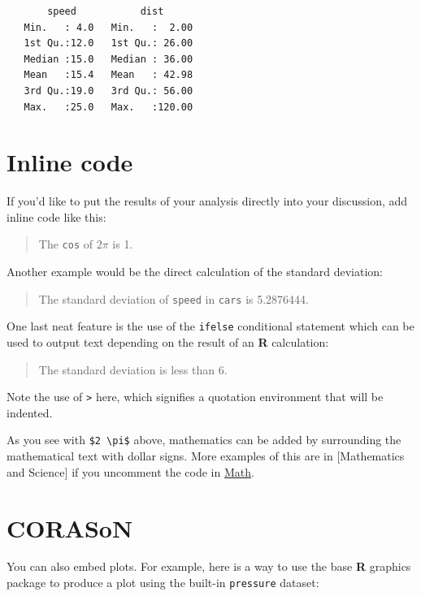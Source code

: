 \documentclass[12pt,twoside]{reedthesis}
\begin{document}
  \begin{verbatim}
       speed           dist       
   Min.   : 4.0   Min.   :  2.00  
   1st Qu.:12.0   1st Qu.: 26.00  
   Median :15.0   Median : 36.00  
   Mean   :15.4   Mean   : 42.98  
   3rd Qu.:19.0   3rd Qu.: 56.00  
   Max.   :25.0   Max.   :120.00  
  \end{verbatim}
  
  \section{Inline code}\label{inline-code}
  
  If you'd like to put the results of your analysis directly into your
  discussion, add inline code like this:
  
  \begin{quote}
  The \texttt{cos} of \(2 \pi\) is 1.
  \end{quote}
  
  Another example would be the direct calculation of the standard
  deviation:
  
  \begin{quote}
  The standard deviation of \texttt{speed} in \texttt{cars} is 5.2876444.
  \end{quote}
  
  One last neat feature is the use of the \texttt{ifelse} conditional
  statement which can be used to output text depending on the result of an
  \textbf{R} calculation:
  
  \begin{quote}
  The standard deviation is less than 6.
  \end{quote}
  
  Note the use of \texttt{\textgreater{}} here, which signifies a
  quotation environment that will be indented.
  
  As you see with \texttt{\$2\ \textbackslash{}pi\$} above, mathematics
  can be added by surrounding the mathematical text with dollar signs.
  More examples of this are in {[}Mathematics and Science{]} if you
  uncomment the code in \protect\hyperlink{math}{Math}.
  
  \section{CORASoN}\label{corason}
  
  You can also embed plots. For example, here is a way to use the base
  \textbf{R} graphics package to produce a plot using the built-in
  \texttt{pressure} dataset:
  
\end{document}
